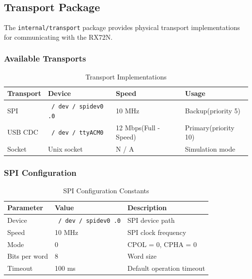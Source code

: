 \subsection{Transport Package}

The \texttt{internal/transport} package provides physical transport implementations for communicating with the RX72N.

\subsubsection{Available Transports
}

\begin{table}[H]
\centering
\caption{Transport Implementations}
\label{tab:transport-implementations}
\begin{tabular} { | l | l | l | l |}
\hline
\textbf{Transport} & \textbf{Device} & \textbf{Speed} & \textbf{Usage}
\\
\hline SPI & \texttt{ / dev / spidev0 .0} &
    10 MHz &Backup(priority 5) \\
USB CDC & \texttt{ / dev / ttyACM0} &
    12 Mbps(Full - Speed) &
    Primary(priority 10) \\
Socket &Unix socket &N / A &Simulation mode \\
\hline
\end{tabular}
\end{table}

\subsubsection{SPI Configuration}

\begin{table}[H]
\centering
\caption{SPI Configuration Constants}
\label{tab:spi-config}
\begin{tabular} { | l | l | l |}
\hline
\textbf{Parameter} & \textbf{Value} & \textbf{Description}
\\
\hline Device & \texttt{
    / dev / spidev0 .0} &SPI device path \\
Speed & 10 MHz &SPI clock
    frequency \\
Mode & 0 &CPOL = 0,
                         CPHA = 0 \\
Bits per word & 8 & Word size \\
Timeout &
                                100 ms & Default operation timeout \\
\hline
\end{tabular}
\end{table}

